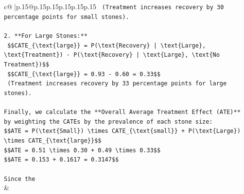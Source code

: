 \documentclass{article}
\begin{document}
{\begin{supertabular}{c@{$\;$}|p{.15\linewidth}@{}p{.15\linewidth}p{.15\linewidth}p{.15\linewidth}p{.15\linewidth}p{.15\linewidth}}
{{{\texttt{    (Treatment increases recovery by 30 percentage points for small stones).} \\
\\ 
\texttt{2.  **For Large Stones:**} \\
\texttt{    \$\$CATE\_\{\textbackslash{}text\{large\}\} = P(\textbackslash{}text\{Recovery\} | \textbackslash{}text\{Large\}, \textbackslash{}text\{Treatment\}) {-} P(\textbackslash{}text\{Recovery\} | \textbackslash{}text\{Large\}, \textbackslash{}text\{No Treatment\})\$\$} \\
\texttt{    \$\$CATE\_\{\textbackslash{}text\{large\}\} = 0.93 {-} 0.60 = 0.33\$\$} \\
\texttt{    (Treatment increases recovery by 33 percentage points for large stones).} \\
\\ 
\texttt{Finally, we calculate the **Overall Average Treatment Effect (ATE)** by weighting the CATEs by the prevalence of each stone size:} \\
\texttt{\$\$ATE = P(\textbackslash{}text\{Small\}) \textbackslash{}times CATE\_\{\textbackslash{}text\{small\}\} + P(\textbackslash{}text\{Large\}) \textbackslash{}times CATE\_\{\textbackslash{}text\{large\}\}\$\$} \\
\texttt{\$\$ATE = 0.51 \textbackslash{}times 0.30 + 0.49 \textbackslash{}times 0.33\$\$} \\
\texttt{\$\$ATE = 0.153 + 0.1617 = 0.3147\$\$} \\
\\ 
\texttt{Since the} \\
            }
        }
    }
    & \\ \\


\end{supertabular}}
\end{document}
